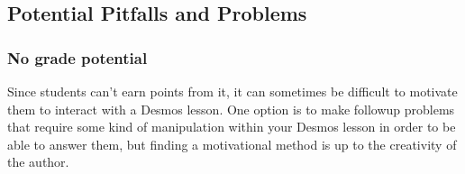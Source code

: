 \documentclass{ximera}
\begin{document}
    \subsection*{Potential Pitfalls and Problems}
        \subsubsection*{No grade potential}
            Since students can't earn points from it, it can sometimes be difficult to motivate them to interact with a Desmos lesson. One option is to make followup problems that require some kind of manipulation within your Desmos lesson in order to be able to answer them, but finding a motivational method is up to the creativity of the author.
    
\end{document}
